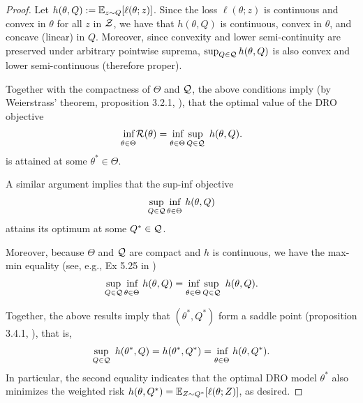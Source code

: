 \begin{proof}
  Let $h(\theta, Q) := \mathbb{E}_{z \sim Q} [\ell(\theta; z)]$. Since the loss $\ell(\theta; z)$ is continuous and convex in $\theta$ for all $z$ in $\mathcal{Z}$,
  we have that $h(\theta, Q)$ is continuous,
  convex in $\theta$, and concave (linear) in $Q$.
  Moreover, since convexity and lower semi-continuity are preserved under arbitrary pointwise suprema,
  $\sup_{Q \in \mathcal{Q}} h(\theta, Q)$ is also convex and lower semi-continuous (therefore proper).

  Together with the compactness of $\Theta$ and $\mathcal{Q}$,
  the above conditions imply
  (by Weierstrass' theorem, proposition 3.2.1, \citet{bertsekas2009convex}),
  that the optimal value of the DRO objective
  \begin{align}
      \underset{\theta \in \Theta}{\vphantom{\sup}\inf} \sR(\theta) = \underset{\theta \in \Theta}{\vphantom{\sup}\inf} \sup_{Q \in \sQ} \ h(\theta, Q).
  \end{align}
  is attained at some $\theta^* \in \Theta$.

  A similar argument implies that the sup-inf objective
  \begin{align}
     \sup_{Q \in \mathcal{Q}} \underset{\theta \in \Theta}{\vphantom{\sup}\inf} \ h(\theta, Q)
  \end{align}
  attains its optimum at some $Q^* \in \mathcal{Q}$.

  Moreover, because $\Theta$ and $\mathcal{Q}$ are compact and $h$ is continuous,
  we have the max-min equality (see, e.g., Ex 5.25 in \citet{boyd2004convex})
  \begin{align}
     \sup_{Q \in \mathcal{Q}} \underset{\theta \in \Theta}{\vphantom{\sup}\inf} \ h(\theta, Q) = \underset{\theta \in \Theta}{\vphantom{\sup}\inf} \sup_{Q \in \mathcal{Q}} \ h(\theta, Q).
  \end{align}

  Together, the above results imply that $(\theta^*, Q^*)$ form a saddle point (proposition 3.4.1, \citet{bertsekas2009convex}),
  that is,
  \begin{align}
     \sup_{Q \in \mathcal{Q}} \ h(\theta^*, Q) =
     h(\theta^*, Q^*) =
      \underset{\theta \in \Theta}{\vphantom{\sup}\inf} \ h(\theta, Q^*).
  \end{align}
  In particular, the second equality indicates that the optimal DRO model $\theta^*$
  also minimizes the weighted risk
  $h(\theta, Q^*) = \mathbb{E}_{Z \sim Q^*} [\ell(\theta; Z)]$,
  as desired.

\end{proof}


